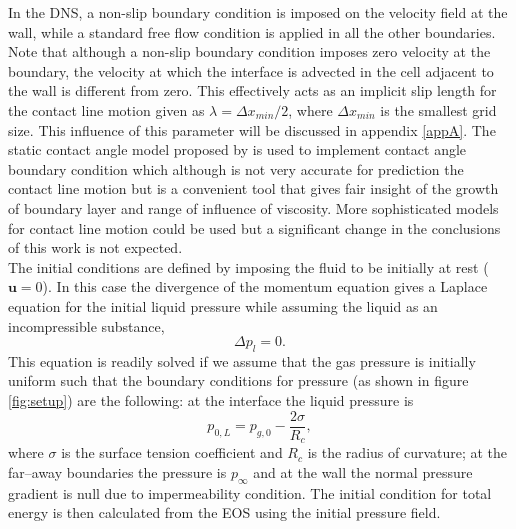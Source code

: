 \documentclass[final]{jfm}
\begin{document}
In the DNS, a non-slip boundary condition is imposed on the velocity field at the wall, while a standard free flow condition is applied in all the other boundaries. Note that although a non-slip boundary condition imposes zero velocity at the boundary, the velocity at which the interface is advected in the cell adjacent to the wall is different from zero. This effectively acts as an implicit slip length for the contact line motion given as $\lambda = \Delta x_{min}/2$, where $\Delta x_{min}$ is the smallest grid size. This influence of this parameter will be discussed in appendix \ref{appA}. The static contact angle model proposed by \citet{afkhami2008height} is used to implement contact angle boundary condition which although is not very accurate for prediction the contact line motion but is a convenient tool that gives fair insight of the growth of boundary layer and range of influence of viscosity. More sophisticated  models for contact line motion could be used but a significant change in the conclusions of this work is not expected.\\
 
The initial conditions are defined by imposing the fluid to be initially at rest ($\boldsymbol{u}=0$). In this case the divergence of the momentum equation gives a Laplace equation for the initial liquid pressure while assuming the liquid as an incompressible substance,
\begin{equation}
    \Delta p_l = 0.
    \label{eq:laplace}
\end{equation}
This equation is readily solved if we assume that the gas pressure is initially uniform such that the boundary conditions for pressure (as shown in figure \ref{fig:setup}) are the following: at the interface the liquid pressure is 
\begin{equation}
p_{0,L}=p_{g,0} - \frac{2\sigma}{R_c},
\label{eq:laplaceInt}
\end{equation}
where $\sigma$ is the surface tension coefficient and $R_c$ is the radius of curvature; at the far--away boundaries the pressure is $p_\infty$ and at the wall the normal pressure gradient is null due to impermeability condition. The initial condition for total energy is then calculated from the EOS using the initial pressure field.\\
 
\end{document}
